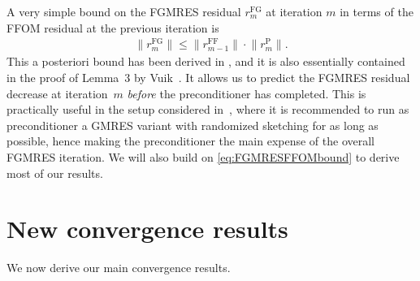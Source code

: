 \documentclass{siamart251216}
\newenvironment{lauri}{\begin{quote}\color{brilliantrose} \small\sf Lauri $\clubsuit$~}{\end{quote}}
\begin{document}
{

A very simple  bound on the FGMRES residual $r_m^{\mathrm{FG}}$ at iteration $m$ in terms of the FFOM residual at the previous iteration is
\begin{align} \label{eq:FGMRESFFOMbound}
    \big\| r_m^{\mathrm{FG}} \big\| \leq
    \big\| r_{m-1}^{\mathrm{FF}} \big\|\cdot
    \big\| r_{m}^{\mathrm{P}} \big\|.
\end{align}
This a posteriori bound has been derived in \cite{guttel2025stabilizing}, and it is also essentially contained in the proof of Lemma~3 by Vuik~\cite{vuik1995new}. It allows us to predict the FGMRES residual decrease at iteration~$m$ \emph{before} the preconditioner has completed. This is practically useful in the setup considered in~\cite{guttel2025stabilizing}, where it is recommended to run as preconditioner a GMRES variant with randomized sketching for as long as possible, hence making the preconditioner the main expense of the overall FGMRES iteration. We will also build on \eqref{eq:FGMRESFFOMbound} to derive most of our results.













\section{New convergence results}\label{sec:new}

We now derive our main convergence results.

}
\end{document}

